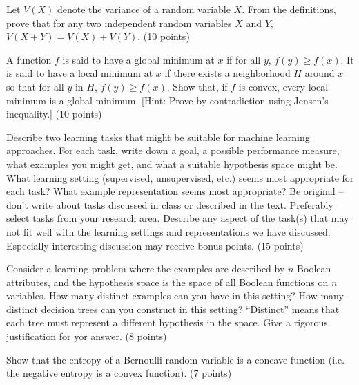 \documentclass[fleqn]{homework}
\begin{document}
  \maketitle

  \begin{problem}{1}
    \begin{question}
      Let $V(X)$ denote the variance of a random variable $X$.  From the
      definitions, prove that for any two independent random variables $X$ and
      $Y$, $V(X + Y) = V(X) + V(Y)$. (10 points)
    \end{question}
  \end{problem}

  \begin{problem}{2}
    \begin{question}
      A function $f$ is said to have a global minimum at $x$ if for all $y$,
      $f(y) \ge f(x)$.  It is said to have a local minimum at $x$ if there
      exists a neighborhood $H$ around $x$ so that for all $y$ in $H$,
      $f(y) \ge f(x)$.  Show that, if $f$ is convex, every local minimum is a
      global minimum.  [Hint: Prove by contradiction using Jensen's inequality.]
      (10 points)
    \end{question}
  \end{problem}

  \begin{problem}{3}
    \begin{question}
      Describe two learning tasks that might be suitable for machine learning
      approaches.  For each task, write down a goal, a possible performance
      measure, what examples you might get, and what a suitable hypothesis space
      might be.  What learning setting (supervised, unsupervised, etc.) seems
      most appropriate for each task?  What example representation seems most
      appropriate?  Be original -- don't write about tasks discussed in class or
      described in the text.  Preferably select tasks from your research area.
      Describe any aspect of the task(s) that may not fit well with the learning
      settings and representations we have discussed.  Especially interesting
      discussion may receive bonus points. (15 points)
    \end{question}
  \end{problem}

  \begin{problem}{4}
    \begin{question}
      Consider a learning problem where the examples are described by $n$
      Boolean attributes, and the hypothesis space is the space of all Boolean
      functions on $n$ variables.  How many distinct examples can you have in
      this setting?  How many distinct decision trees can you construct in this
      setting?  ``Distinct'' means that each tree must represent a different
      hypothesis in the space.  Give a rigorous justification for yor answer. (8
      points)
    \end{question}
  \end{problem}

  \begin{problem}{5}
    \begin{question}
      Show that the entropy of a Bernoulli random variable is a concave function
      (i.e. the negative entropy is a convex function). (7 points)
    \end{question}
  \end{problem}
\end{document}
